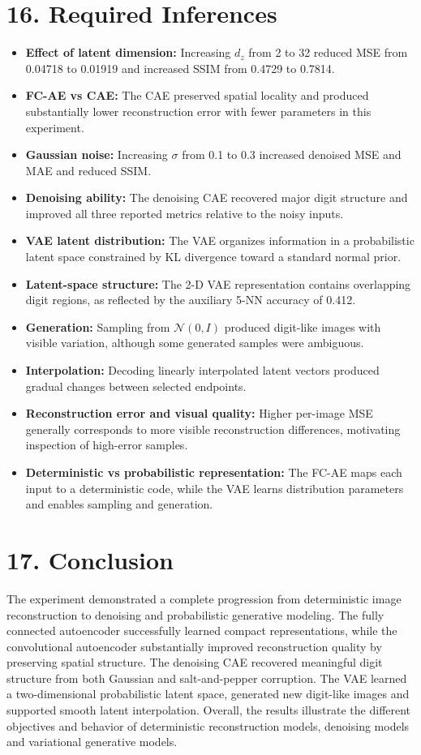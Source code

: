 \documentclass[10pt]{article}
\begin{document}
\section*{16. Required Inferences}
\begin{itemize}
\item \textbf{Effect of latent dimension:} Increasing $d_z$ from 2 to 32 reduced MSE from 0.04718 to 0.01919 and increased SSIM from 0.4729 to 0.7814.
\item \textbf{FC-AE vs CAE:} The CAE preserved spatial locality and produced substantially lower reconstruction error with fewer parameters in this experiment.
\item \textbf{Gaussian noise:} Increasing $\sigma$ from 0.1 to 0.3 increased denoised MSE and MAE and reduced SSIM.
\item \textbf{Denoising ability:} The denoising CAE recovered major digit structure and improved all three reported metrics relative to the noisy inputs.
\item \textbf{VAE latent distribution:} The VAE organizes information in a probabilistic latent space constrained by KL divergence toward a standard normal prior.
\item \textbf{Latent-space structure:} The 2-D VAE representation contains overlapping digit regions, as reflected by the auxiliary 5-NN accuracy of 0.412.
\item \textbf{Generation:} Sampling from $\mathcal{N}(0,I)$ produced digit-like images with visible variation, although some generated samples were ambiguous.
\item \textbf{Interpolation:} Decoding linearly interpolated latent vectors produced gradual changes between selected endpoints.
\item \textbf{Reconstruction error and visual quality:} Higher per-image MSE generally corresponds to more visible reconstruction differences, motivating inspection of high-error samples.
\item \textbf{Deterministic vs probabilistic representation:} The FC-AE maps each input to a deterministic code, while the VAE learns distribution parameters and enables sampling and generation.
\end{itemize}

\section*{17. Conclusion}
The experiment demonstrated a complete progression from deterministic image reconstruction to denoising and probabilistic generative modeling. The fully connected autoencoder successfully learned compact representations, while the convolutional autoencoder substantially improved reconstruction quality by preserving spatial structure. The denoising CAE recovered meaningful digit structure from both Gaussian and salt-and-pepper corruption. The VAE learned a two-dimensional probabilistic latent space, generated new digit-like images and supported smooth latent interpolation. Overall, the results illustrate the different objectives and behavior of deterministic reconstruction models, denoising models and variational generative models.
\end{document}
